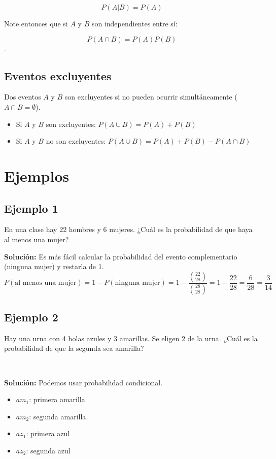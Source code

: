 \documentclass[letterpaper, 12pt]{article}
\begin{document}
	$$P(A | B) = P(A)$$
	
	Note entonces que si $A$ y $B$ son independientes entre sí:
	
	$$P(A \cap B) = P(A)P(B)$$.
	
	\subsection{Eventos excluyentes}
	Dos eventos $A$ y $B$ son excluyentes si no pueden ocurrir simultáneamente ($A \cap B = \emptyset$).
	\begin{itemize}
		\item Si $A$ y $B$ son excluyentes: $P(A \cup B) = P(A) + P(B)$
		\item Si $A$ y $B$ no son excluyentes: $P(A \cup B) = P(A) + P(B) - P(A \cap B)$
	\end{itemize}
	
	\section{Ejemplos}
	
	\subsection{Ejemplo 1}
	En una clase hay 22 hombres y 6 mujeres. ¿Cuál es la probabilidad de que haya al menos una mujer?
	
	\textbf{Solución:}
	Es más fácil calcular la probabilidad del evento complementario (ninguna mujer) y restarla de 1.
	$$P(\text{al menos una mujer}) = 1 - P(\text{ninguna mujer}) = 1 - \frac{\binom{22}{28}}{\binom{28}{28}} = 1 - \frac{22}{28} = \frac{6}{28} = \boxed{\frac{3}{14}}$$
	
	\subsection{Ejemplo 2}
	Hay una urna con 4 bolas azules y 3 amarillas. Se eligen 2 de la urna. ¿Cuál es la probabilidad de que la segunda sea amarilla?
	
	\,
	
	
	\textbf{Solución:}
	Podemos usar probabilidad condicional.
	
	\begin{itemize}
		\item $am_1$: primera amarilla
		\item $am_2$: segunda amarilla
		\item $az_1$: primera azul
		\item $az_2$: segunda azul
	\end{itemize}
	
\end{document}
